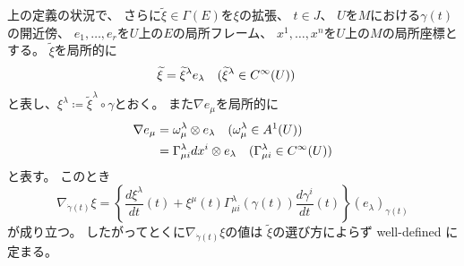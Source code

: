 \documentclass[report]{jlreq}
\begin{document}
\begin{proposition}
    上の定義の状況で、
    さらに$\widetilde{\xi} \in \Gamma(E)$を$\xi$の拡張、
    $t \in J$、
    $U$を$M$における$\gamma(t)$の開近傍、
    $e_1, \dots, e_r$を$U$上の$E$の局所フレーム、
    $x^1, \dots, x^n$を$U$上の$M$の局所座標とする。
    $\widetilde{\xi}$を局所的に
    \begin{alignat}{1}
        \widetilde{\xi} &= \widetilde{\xi}^\lambda e_\lambda
            \quad
            (\widetilde{\xi}^\lambda \in C^\infty(U))
    \end{alignat}
    と表し、$\xi^\lambda \coloneqq \widetilde{\xi}^\lambda \circ \gamma$とおく。
    また$\nabla e_\mu$を局所的に
    \begin{alignat}{1}
        \nabla e_\mu
            &= \omega_\mu^\lambda \otimes e_\lambda
                \quad
                (\omega_\mu^\lambda \in A^1(U)) \\
            &= \Gamma^\lambda_{\mu i} dx^i \otimes e_\lambda
                \quad
                (\Gamma^\lambda_{\mu i} \in C^\infty(U))
    \end{alignat}
    と表す。
    このとき
    \begin{equation}
        \nabla_{\dot{\gamma}(t)} \xi
            = \left\{
                \frac{d\xi^\lambda}{dt}(t)
                +
                \xi^\mu (t)
                \Gamma^\lambda_{\mu i} (\gamma(t))
                \frac{d\gamma^i}{dt}(t)
            \right\}
            (e_\lambda)_{\gamma(t)}
    \end{equation}
    が成り立つ。
    したがってとくに$\nabla_{\dot{\gamma}(t)} \xi$の値は
    $\widetilde{\xi}$の選び方によらず well-defined に定まる。
\end{proposition}
\end{document}
